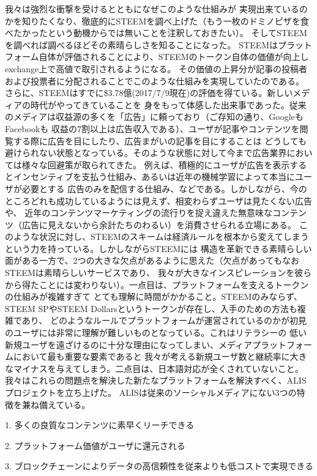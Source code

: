 \documentclass{jsarticle}
\begin{document}
我々は強烈な衝撃を受けるとともになぜこのような仕組みが
実現出来ているのかを知りたくなり、徹底的にSTEEMを調べ上げた（もう一枚のドミノピザを食べたかったという動機からでは無いことを注釈しておきたい）。
そしてSTEEMを調べれば調べるほどその素晴らしさを知ることになった。
STEEMはプラットフォーム自体が評価されることにより、STEEMのトークン自体の価値が向上しexchange上で高値で取引されるようになる。
その価値の上昇分が記事の投稿者および投票者に分配されることでこのような仕組みを実現していたのである。
さらに、STEEMはすでに\$3.78億(2017/7/9現在)の評価を得ている。新しいメディアの時代がやってきていることを
身をもって体感した出来事であった。従来のメディアは収益源の多くを「広告」に頼っており（ご存知の通り、GoogleもFacebookも
収益の7割以上は広告収入である）、ユーザが記事やコンテンツを閲覧する際に広告を目にしたり、広告まがいの記事を目にすることは
どうしても避けられない状態となっている。そのような状態に対して今まで広告業界においては様々な回避策が取られてきた。
例えば、積極的にユーザが広告を表示するとインセンティブを支払う仕組み、あるいは近年の機械学習によって本当にユーザが必要とする
広告のみを配信する仕組み、などである。しかしながら、今のところどれも成功しているようには見えず、相変わらずユーザは見たくない広告や、
近年のコンテンツマーケティングの流行りを捉え違えた無意味なコンテンツ（広告に見えないから余計たちのわるい）を消費させられる立場にある。
このような状況に対し、STEEMのスキームは経済ルールを根本から変えてしまうという力を持っている。しかしながらSTEEMには
構造を革新できる素晴らしい面がある一方で、2つの大きな欠点があるように思えた（欠点があってもなおSTEEMは素晴らしいサービスであり、
我々が大きなインスピレーションを彼らから得たことには変わりない）。一点目は、プラットフォームを支えるトークンの仕組みが複雑すぎて
とても理解に時間がかかること。STEEMのみならず、STEEM SPやSTEEM Dollarsというトークンが存在し、入手のための方法も複雑であり、
どのようなルールでプラットフォームが運営されているのかが初見のユーザには非常に理解が難しいものとなっている。これはリテラシーの
低い新規ユーザを遠ざけるのに十分な理由になってしまい、メディアプラットフォームにおいて最も重要な要素であると
我々が考える新規ユーザ数と継続率に大きなマイナスを与えてしまう。二点目は、日本語対応が全くされていないこと。
我々はこれらの問題点を解決した新たなプラットフォームを解決すべく、ALISプロジェクトを立ち上げた。
ALISは従来のソーシャルメディアにない3つの特徴を兼ね備えている。

1. 多くの良質なコンテンツに素早くリーチできる

2. プラットフォーム価値がユーザに還元される

3. ブロックチェーンによりデータの高信頼性を従来よりも低コストで実現できる
\end{document}
